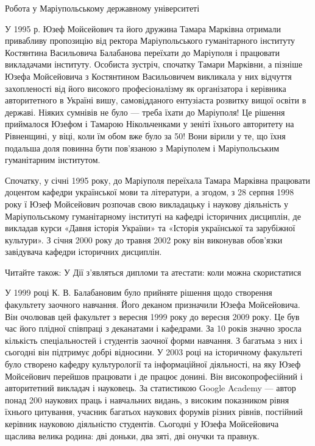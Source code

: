 Робота у Маріупольському державному університеті

У 1995 р. Юзеф Мойсейович та його дружина Тамара Марківна отримали привабливу
пропозицію від ректора Маріупольського гуманітарного інституту Костянтина
Васильовича Балабанова переїхати до Маріуполя і працювати викладачами
інституту. Особиста зустріч, спочатку Тамари Марківни, а пізніше Юзефа
Мойсейовича з Костянтином Васильовичем викликала у них відчуття захопленості
від його високого професіоналізму як організатора і керівника авторитетного в
Україні вишу, самовідданого ентузіаста розвитку вищої освіти в державі. Ніяких
сумнівів не було — треба їхати до Маріуполя! Це рішення приймалося Юзефом і
Тамарою Нікольченками у зеніті їхнього авторитету на Рівненщині, у віці, коли
їм обом вже було за 50! Вони вірили у те, що їхня подальша доля повинна бути
пов’язаною з Маріуполем і Маріупольським гуманітарним інститутом.

Спочатку, у січні 1995 року, до Маріуполя переїхала Тамара Марківна працювати
доцентом кафедри української мови та літератури, а згодом, з 28 серпня 1998
року ї Юзеф Мойсейович розпочав свою викладацьку і наукову діяльність у
Маріупольському гуманітарному інституті на кафедрі історичних дисциплін, де
викладав курси «Давня історія України» та «Історія української та зарубіжної
культури». З січня 2000 року до травня 2002 року він виконував обов’язки
завідувача кафедри історичних дисциплін.

Читайте також: У Дії з’являться дипломи та атестати: коли можна скористатися

У 1999 році К. В. Балабановим було прийняте рішення щодо створення факультету
заочного навчання. Його деканом призначили Юзефа Мойсейовича. Він очолював цей
факультет з вересня 1999 року до вересня 2009 року. Це був час його плідної
співпраці з деканатами і кафедрами. За 10 років значно зросла кількість
спеціальностей і студентів заочної форми навчання. З багатьма з них і сьогодні
він підтримує добрі відносини. У 2003 році на історичному факультеті було
створено кафедру культурології та інформаційної діяльності, на яку Юзеф
Мойсейович перейшов працювати і де працює донині. Він високопрофесійний і
авторитетний викладач і науковець. За статистикою Google Academy — автор понад
200 наукових праць і навчальних видань, з високим показником рівня їхнього
цитування, учасник багатьох наукових форумів різних рівнів, постійний керівник
науковою діяльністю студентів. Сьогодні у Юзефа Мойсейовича щаслива велика
родина: дві доньки, два зяті, дві онучки та правнук.

